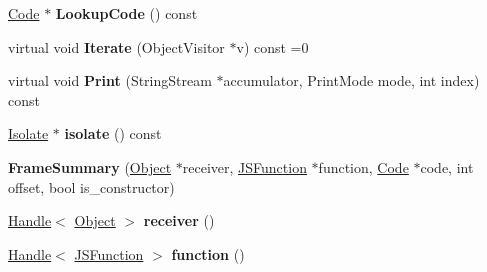\begin{DoxyCompactItemize}
\item 
\hypertarget{classv8_1_1internal_1_1_b_a_s_e___e_m_b_e_d_d_e_d_abf83e3a58f31f6a562d0e6f198af1cc4}{}\hyperlink{classv8_1_1internal_1_1_code}{Code} $\ast$ {\bfseries Lookup\+Code} () const \label{classv8_1_1internal_1_1_b_a_s_e___e_m_b_e_d_d_e_d_abf83e3a58f31f6a562d0e6f198af1cc4}

\item 
\hypertarget{classv8_1_1internal_1_1_b_a_s_e___e_m_b_e_d_d_e_d_a7f20c2d4f764ba93b599cd01349d0435}{}virtual void {\bfseries Iterate} (Object\+Visitor $\ast$v) const =0\label{classv8_1_1internal_1_1_b_a_s_e___e_m_b_e_d_d_e_d_a7f20c2d4f764ba93b599cd01349d0435}

\item 
\hypertarget{classv8_1_1internal_1_1_b_a_s_e___e_m_b_e_d_d_e_d_a2f98a596e8fee44b5df663e2d884f7a1}{}virtual void {\bfseries Print} (String\+Stream $\ast$accumulator, Print\+Mode mode, int index) const \label{classv8_1_1internal_1_1_b_a_s_e___e_m_b_e_d_d_e_d_a2f98a596e8fee44b5df663e2d884f7a1}

\item 
\hypertarget{classv8_1_1internal_1_1_b_a_s_e___e_m_b_e_d_d_e_d_aafca7727b44748c75ff39a90282dfb8d}{}\hyperlink{classv8_1_1internal_1_1_isolate}{Isolate} $\ast$ {\bfseries isolate} () const \label{classv8_1_1internal_1_1_b_a_s_e___e_m_b_e_d_d_e_d_aafca7727b44748c75ff39a90282dfb8d}

\item 
\hypertarget{classv8_1_1internal_1_1_b_a_s_e___e_m_b_e_d_d_e_d_aaff9a4f02f471a6f19c91b4364f7bd69}{}{\bfseries Frame\+Summary} (\hyperlink{classv8_1_1internal_1_1_object}{Object} $\ast$receiver, \hyperlink{classv8_1_1internal_1_1_j_s_function}{J\+S\+Function} $\ast$function, \hyperlink{classv8_1_1internal_1_1_code}{Code} $\ast$code, int offset, bool is\+\_\+constructor)\label{classv8_1_1internal_1_1_b_a_s_e___e_m_b_e_d_d_e_d_aaff9a4f02f471a6f19c91b4364f7bd69}

\item 
\hypertarget{classv8_1_1internal_1_1_b_a_s_e___e_m_b_e_d_d_e_d_a78e60580a4ca77a9ac4617c91dd55841}{}\hyperlink{classv8_1_1internal_1_1_handle}{Handle}$<$ \hyperlink{classv8_1_1internal_1_1_object}{Object} $>$ {\bfseries receiver} ()\label{classv8_1_1internal_1_1_b_a_s_e___e_m_b_e_d_d_e_d_a78e60580a4ca77a9ac4617c91dd55841}

\item 
\hypertarget{classv8_1_1internal_1_1_b_a_s_e___e_m_b_e_d_d_e_d_ad0987f07faca70ec86f7a13bc8698386}{}\hyperlink{classv8_1_1internal_1_1_handle}{Handle}$<$ \hyperlink{classv8_1_1internal_1_1_j_s_function}{J\+S\+Function} $>$ {\bfseries function} ()\label{classv8_1_1internal_1_1_b_a_s_e___e_m_b_e_d_d_e_d_ad0987f07faca70ec86f7a13bc8698386}


\end{DoxyCompactItemize}
